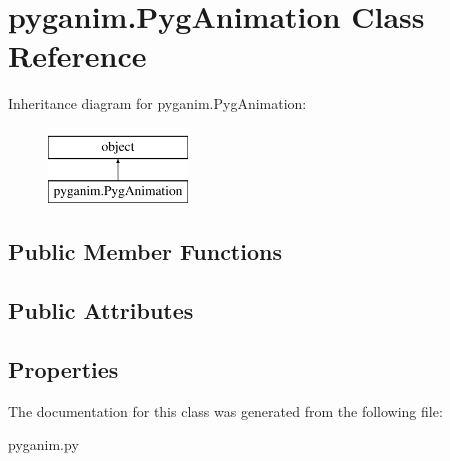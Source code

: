 \hypertarget{classpyganim_1_1_pyg_animation}{}\section{pyganim.\+Pyg\+Animation Class Reference}
\label{classpyganim_1_1_pyg_animation}
Inheritance diagram for pyganim.\+Pyg\+Animation\+:\begin{figure}[H]
\begin{center}
\leavevmode
\includegraphics[height=2.000000cm]{classpyganim_1_1_pyg_animation}
\end{center}
\end{figure}
\subsection*{Public Member Functions}
\begin{DoxyCompactItemize}
\end{DoxyCompactItemize}
\subsection*{Public Attributes}
\begin{DoxyCompactItemize}
\end{DoxyCompactItemize}
\subsection*{Properties}
\begin{DoxyCompactItemize}
\end{DoxyCompactItemize}


The documentation for this class was generated from the following file\+:\begin{DoxyCompactItemize}
\item 
pyganim.\+py\end{DoxyCompactItemize}
